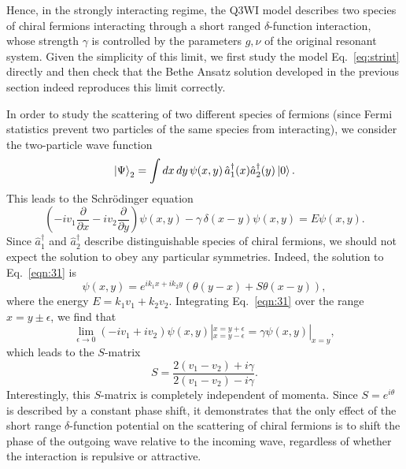 \documentclass[aps,pra,
superscriptaddress,
reprint,twocolumn,preprintnumbers,
amsmath,amssymb,
nofootinbib]{revtex4-1}
\begin{document}
Hence, in the strongly interacting regime, the Q3WI model describes two species of chiral fermions interacting through a short ranged $\delta$-function interaction, whose strength $\gamma$ is controlled by the parameters $g,\nu$ of the original resonant system. Given the simplicity of this limit, we first study the model Eq.~\eqref{eq:strint} directly and then check that the Bethe Ansatz solution developed in the previous section indeed reproduces this limit correctly. 
		
In order to study the scattering of two different species of fermions (since Fermi statistics prevent two particles of the same species from interacting), we consider the two-particle wave function
		\begin{equation}
		\ket{\Psi}_2 = \int dx\,dy \, \psi(x,y) \, \hat a_1^\dagger(x) \hat a_2^\dagger(y)\ket{0}.
		\end{equation}
This leads to the Schr\"odinger equation
		\begin{equation}
		\label{eqn:31}
		\left(-i v_1 \frac{\partial}{\partial x} - i v_2 \frac{\partial}{\partial y} \right) \psi(x,y) - \gamma  \, \delta(x - y) \psi(x,y)= E \psi(x,y).
		\end{equation}
Since $\hat{a}_1^\dagger$ and $\hat{a}_2^\dagger$ describe distinguishable species of chiral fermions, we should not expect the solution to obey any particular symmetries. Indeed, the solution to Eq.~\eqref{eqn:31} is
		\begin{equation}
		\psi(x,y) = e^{i k_1 x + i k_2 y} \left(\theta(y-x) + S \theta(x - y) \right),
		\end{equation}
where the energy $E = k_1 v_1 + k_2 v_2$. Integrating Eq.~\eqref{eqn:31} over the range $x = y \pm \epsilon$, we find that
		\begin{equation}
		\lim_{\epsilon\to0}\left(-i v_1 + i v_2\right) \psi(x,y)|_{x=y-\epsilon}^{x=y+\epsilon} = \gamma \psi(x,y)|_{x=y},
		\end{equation}
which leads to the $S$-matrix
		\begin{equation}
		\label{eqn:34}
		S = \frac{2(v_1 - v_2) + i\gamma}{2(v_1 - v_2) - i \gamma}.
		\end{equation}
Interestingly, this $S$-matrix is completely independent of momenta. Since $S = e^{i \theta}$ is described by a constant phase shift, it demonstrates that the only effect of the short range $\delta$-function potential on the scattering of chiral fermions is to shift the phase of the outgoing wave relative to the incoming wave, regardless of whether the interaction is repulsive or attractive. 
\end{document}
